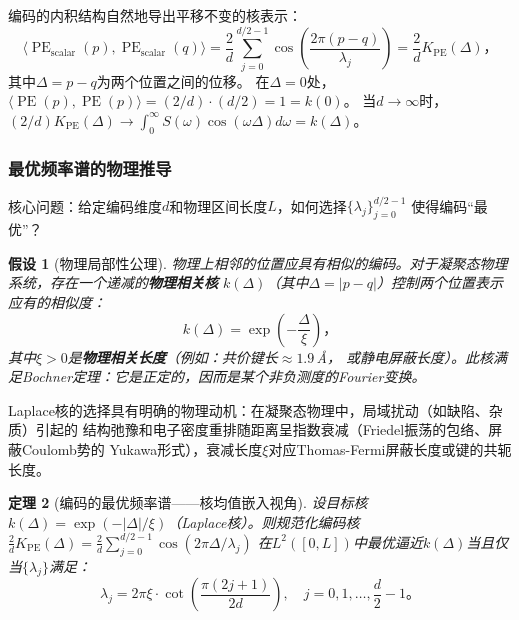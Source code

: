 \documentclass[11pt,a4paper]{article}
\newtheorem{theorem}{定理}[section]
\newtheorem{assumption}[theorem]{假设}
\theoremstyle{remark}
\DeclareMathOperator{\PE}{PE}
\begin{document}
编码的内积结构自然地导出平移不变的核表示：
\begin{equation}
    \langle \PE_{\text{scalar}}(p), \PE_{\text{scalar}}(q) \rangle
    = \frac{2}{d}\sum_{j=0}^{d/2-1} \cos\!\left(\frac{2\pi(p-q)}{\lambda_j}\right)
    = \frac{2}{d}K_{\PE}(\Delta)，
\end{equation}
其中$\Delta = p - q$为两个位置之间的位移。
在$\Delta = 0$处，$\langle \PE(p), \PE(p) \rangle = (2/d) \cdot (d/2) = 1 = k(0)$。
当$d \to \infty$时，$(2/d)K_{\PE}(\Delta) \to \int_0^\infty S(\omega)\cos(\omega\Delta)d\omega = k(\Delta)$。

\subsubsection{最优频率谱的物理推导}

核心问题：给定编码维度$d$和物理区间长度$L$，如何选择$\{\lambda_j\}_{j=0}^{d/2-1}$
使得编码``最优''？

\begin{assumption}[物理局部性公理]
\label{ass:1.2.1}
物理上相邻的位置应具有相似的编码。对于凝聚态物理系统，存在一个递减的\textbf{物理相关核}
$k(\Delta)$（其中$\Delta = |p-q|$）控制两个位置表示应有的相似度：
\begin{equation}
    k(\Delta) = \exp\!\left(-\frac{\Delta}{\xi}\right)，
\end{equation}
其中$\xi > 0$是\textbf{物理相关长度}（例如：共价键长$\approx 1.9$\,\AA{}，
或静电屏蔽长度）。此核满足Bochner定理：它是正定的，因而是某个非负测度的Fourier变换。
\end{assumption}

Laplace核的选择具有明确的物理动机：在凝聚态物理中，局域扰动（如缺陷、杂质）引起的
结构弛豫和电子密度重排随距离呈指数衰减（Friedel振荡的包络、屏蔽Coulomb势的
Yukawa形式），衰减长度$\xi$对应Thomas-Fermi屏蔽长度或键的共轭长度。

\begin{theorem}[编码的最优频率谱——核均值嵌入视角]
\label{thm:1.2.1}
设目标核$k(\Delta) = \exp(-|\Delta|/\xi)$（Laplace核）。则规范化编码核
$\frac{2}{d}K_{\PE}(\Delta) = \frac{2}{d}\sum_{j=0}^{d/2-1} \cos(2\pi\Delta/\lambda_j)$
在$L^2([0, L])$中最优逼近$k(\Delta)$当且仅当$\{\lambda_j\}$满足：
\begin{equation}
    \boxed{
    \lambda_j = 2\pi\xi \cdot \cot\!\left(\frac{\pi(2j+1)}{2d}\right),\quad
    j = 0, 1, \ldots, \frac{d}{2}-1
    }。
\end{equation}
\end{theorem}
\end{document}
